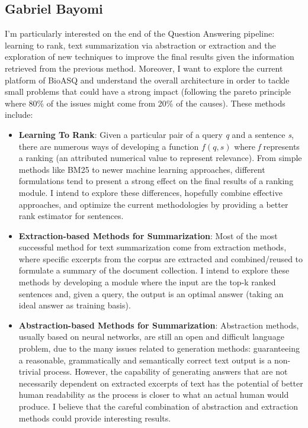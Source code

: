 \documentclass{article}
\begin{document}
\pagebreak

\subsection{Gabriel Bayomi}
I'm particularly interested on the end of the Question Answering pipeline: learning to rank, text summarization via abstraction or extraction and the exploration of new techniques to improve the final results given the information retrieved from the previous method. Moreover, I want to explore the current platform of BioASQ and understand the overall architecture in order to tackle small problems that could have a strong impact (following the pareto principle where 80\% of the issues might come from 20\% of the causes). These methods include:

\begin{itemize}
    \item \textbf{Learning To Rank}: Given a particular pair of a query \textit{q} and a sentence \textit{s}, there are numerous ways of developing a function $f(q, s)$ where \textit{f} represents a ranking (an attributed numerical value to represent relevance). From simple methods like BM25 to newer machine learning approaches, different formulations tend to present a strong effect on the final results of  a ranking module. I intend to explore these differences, hopefully combine effective approaches, and optimize the current methodologies by providing a better rank estimator for sentences.
    
    \item \textbf{Extraction-based Methods for Summarization}: Most of the most successful method for text summarization come from extraction methods, where specific excerpts from the corpus are extracted and combined/reused to formulate a summary of the document collection. I intend to explore these methods by developing a module where the input are the top-k ranked sentences and, given a query, the output is an optimal answer (taking an ideal answer as training basis).
    
    \item \textbf{Abstraction-based Methods for Summarization}: Abstraction methods, usually based on neural networks, are still an open and difficult language problem, due to the many issues related to generation methods: guaranteeing a reasonable, grammatically and semantically correct text output is a non-trivial process. However, the capability of generating answers that are not necessarily dependent on extracted excerpts of text has the potential of better human readability as the process is closer to what an actual human would produce. I believe that the careful combination of abstraction and extraction methods could provide interesting results.
    

\end{itemize}
\end{document}
